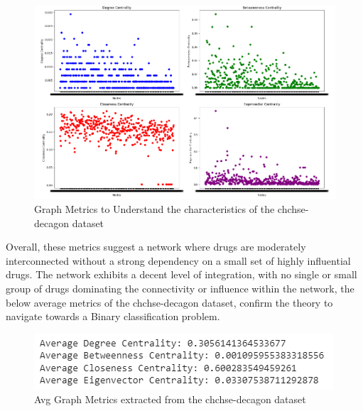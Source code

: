\documentclass[journal,transmag]{J-NaNA}
\begin{document}
\begin{figure}[htbp]
\centering
\includegraphics[width=\linewidth]{chchse-decagon-graph-metrics-viz.PNG} 
\caption{Graph Metrics to Understand the characteristics of the chchse-decagon dataset}
\label{fig: chchse-decagon visualization metrics } %
\end{figure}

Overall, these metrics suggest a network where drugs are moderately interconnected without a strong dependency on a small set of highly influential drugs. The network exhibits a decent level of integration, with no single or small group of drugs dominating the connectivity or influence within the network, the below average metrics of the chchse-decagon dataset, confirm the theory to navigate towards a Binary classification problem. 

\begin{figure}[htbp]
\centering
\includegraphics[width=\linewidth]{chchse-decagon-graph-metrics.PNG} 
\caption{Avg Graph Metrics extracted from the chchse-decagon dataset}
\label{fig: chchse-decagon visualization metrics } %
\end{figure}
\end{document}
